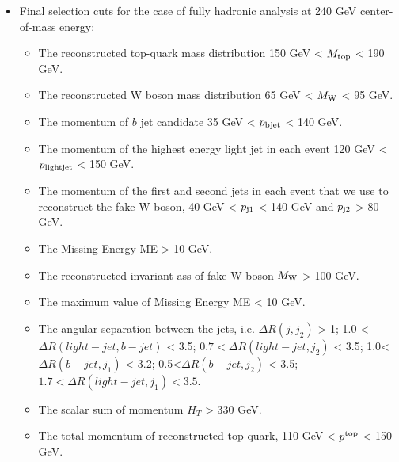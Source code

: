 \documentclass[11pt,onecolumn,english,showpacs,preprintnumbers,amsmath,amssymb,floatfix,nofootinbib]{revtex4-1}
\begin{document}
\begin{itemize}
\item Final selection cuts for the case of fully hadronic analysis at 240 GeV center-of-mass energy:
\begin{itemize}
\item The reconstructed top-quark mass distribution 150 GeV < $M_{\rm top}$ < 190 GeV.
\item The reconstructed W boson mass distribution  65 GeV < $M_{\rm W}$ < 95 GeV.
\item The momentum of $b$ jet candidate 35 GeV < $p_{\rm bjet}$ < 140 GeV.
\item The momentum of the highest energy light jet in each event 120 GeV <  $p_{\rm lightjet}$ < 150 GeV.
\item The momentum of the  first and second jets in each event that we use to reconstruct the fake W-boson, 
40 GeV <  $p_{\rm j1}$ < 140 GeV and $p_{\rm j2}$ > 80 GeV.
\item The Missing Energy ME > 10 GeV.   
\item The reconstructed invariant ass of fake W boson $M_{\rm W}$ > 100 GeV.
\item The maximum value of Missing Energy ME < 10 GeV.
\item The angular separation between the jets, i.e. $\Delta R(j, j_2)$ > 1; 1.0 < $\Delta R({light-jet}, b-jet)$ < 3.5; 
$0.7<\Delta R({light-jet}, j_2)$ < 3.5; 1.0<$\Delta R(b-jet, j_1)$ < 3.2; 0.5<$\Delta R(b-jet, j_2)$ < 3.5;  $1.7<\Delta R({light-jet}, j_1) < 3.5$.
\item The scalar sum of momentum $H_T$ > 330 GeV.
\item The total momentum of reconstructed top-quark, 110 GeV < $p^{\rm top}$ < 150 GeV.
\end{itemize}
\end{itemize}
  
\end{document}
